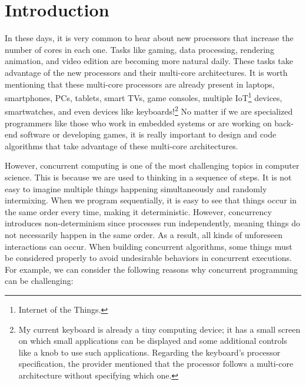 \chapter{\label{chapter:1_Introduction}Introduction}

In these days, it is very common to hear about new processors that increase the number of cores in each one. Tasks like gaming, data processing, rendering animation, and video edition are becoming more natural daily. These tasks take advantage of the new processors and their multi-core architectures. It is worth mentioning that these multi-core processors are already present in laptops, smartphones, PCs, tablets, smart TVs, game consoles, multiple IoT\footnote{Internet of the Things.} devices, smartwatches, and even devices like keyboards!\footnote{My current keyboard is already a tiny computing device; it has a small screen on which small applications can be displayed and some additional controls like a knob to use such applications. Regarding the keyboard's processor specification, the provider mentioned that the processor follows a multi-core architecture without specifying which one.} No matter if we are specialized programmers like those who work in embedded systems or are working on back-end software or developing games, it is really important to design and code algorithms that take advantage of these multi-core architectures.

However, concurrent computing is one of the most challenging topics in computer science. This is because we are used to thinking in a sequence of steps. It is not easy to imagine multiple things happening simultaneously and randomly intermixing. When we program sequentially, it is easy to see that things occur in the same order every time, making it deterministic. However, concurrency introduces non-determinism since processes run independently, meaning things do not necessarily happen in the same order. As a result, all kinds of unforeseen interactions can occur. When building concurrent algorithms, some things must be considered properly to avoid undesirable behaviors in concurrent executions. For example, we can consider the following reasons why concurrent programming can be challenging:

